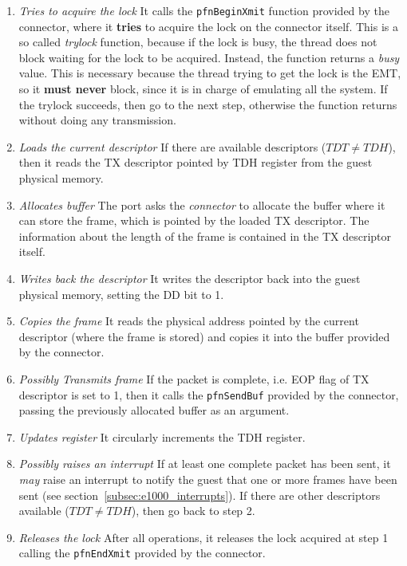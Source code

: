 \documentclass[a4paper, 12pt, titlepage]{report}
\begin{document}
\begin{enumerate}
\item \textit{Tries to acquire the lock} It calls the \texttt{pfnBeginXmit} function provided by the connector, where it \textbf{tries} to acquire the lock on the connector itself. This is a so called \textit{trylock} function, because if the lock is busy, the thread does not block waiting for the lock to be acquired. Instead, the function returns a \textit{busy} value. This is necessary because the thread trying to get the lock is the EMT, so it \textbf{must never} block, since it is in charge of emulating all the system.
If the trylock succeeds, then go to the next step, otherwise the function returns without doing any transmission.
\item \textit{Loads the current descriptor} If there are available descriptors ($TDT \neq TDH$), then it reads the TX descriptor pointed by TDH register from the guest physical memory.
\item \textit{Allocates buffer} The port asks the \textit{connector} to allocate the buffer where it can store the frame, which is pointed by the loaded TX descriptor. The information about the length of the frame is contained in the TX descriptor itself.
\item \textit{Writes back the descriptor} It writes the descriptor back into the guest physical memory, setting the DD bit to 1.
\item \textit{Copies the frame} It reads the physical address pointed by the current descriptor (where the frame is stored) and copies it into the buffer provided by the connector.
\item \textit{Possibly Transmits frame} If the packet is complete, i.e. EOP flag of TX descriptor is set to 1, then it calls the \texttt{pfnSendBuf} provided by the connector, passing the previously allocated buffer as an argument.
\item \textit{Updates register} It circularly increments the TDH register.
\item \textit{Possibly raises an interrupt} If at least one complete packet has been sent, it \textit{may} raise an interrupt to notify the guest that one or more frames have been sent (see section~\ref{subsec:e1000_interrupts}). If there are other descriptors available ($TDT \neq TDH$), then go back to step 2.
\item \textit{Releases the lock} After all operations, it releases the lock acquired at step 1 calling the \texttt{pfnEndXmit} provided by the connector.
\end{enumerate}
\end{document}
